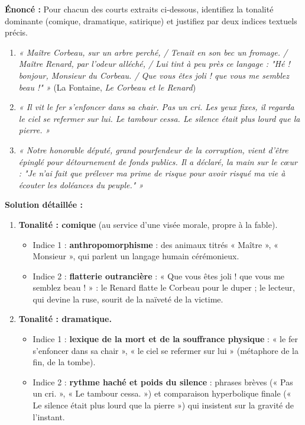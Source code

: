 \documentclass[11pt]{article}
\begin{document}
\begin{exoresolu}
\textbf{Énoncé :} Pour chacun des courts extraits ci-dessous, identifiez la tonalité dominante (comique, dramatique, satirique) et justifiez par deux indices textuels précis.
\begin{enumerate}
    \item \emph{« Maître Corbeau, sur un arbre perché, / Tenait en son bec un fromage. / Maître Renard, par l'odeur alléché, / Lui tint à peu près ce langage : "Hé ! bonjour, Monsieur du Corbeau. / Que vous êtes joli ! que vous me semblez beau !" »} (La Fontaine, \emph{Le Corbeau et le Renard})
    \item \emph{« Il vit le fer s'enfoncer dans sa chair. Pas un cri. Les yeux fixes, il regarda le ciel se refermer sur lui. Le tambour cessa. Le silence était plus lourd que la pierre. »}
    \item \emph{« Notre honorable député, grand pourfendeur de la corruption, vient d'être épinglé pour détournement de fonds publics. Il a déclaré, la main sur le cœur : "Je n'ai fait que prélever ma prime de risque pour avoir risqué ma vie à écouter les doléances du peuple." »}
\end{enumerate}
\tcblower
\textbf{Solution détaillée :}
\begin{enumerate}
    \item \textbf{Tonalité : comique} (au service d'une visée morale, propre à la fable).
    \begin{itemize}
        \item Indice 1 : \textbf{anthropomorphisme} : des animaux titrés « Maître », « Monsieur », qui parlent un langage humain cérémonieux.
        \item Indice 2 : \textbf{flatterie outrancière} : « Que vous êtes joli ! que vous me semblez beau ! » : le Renard flatte le Corbeau pour le duper ; le lecteur, qui devine la ruse, sourit de la naïveté de la victime.
    \end{itemize}
    \item \textbf{Tonalité : dramatique.}
    \begin{itemize}
        \item Indice 1 : \textbf{lexique de la mort et de la souffrance physique} : « le fer s'enfoncer dans sa chair », « le ciel se refermer sur lui » (métaphore de la fin, de la tombe).
        \item Indice 2 : \textbf{rythme haché et poids du silence} : phrases brèves (« Pas un cri. », « Le tambour cessa. ») et comparaison hyperbolique finale (« Le silence était plus lourd que la pierre ») qui insistent sur la gravité de l'instant.

\end{itemize}
\end{enumerate}
\end{exoresolu}
\end{document}
